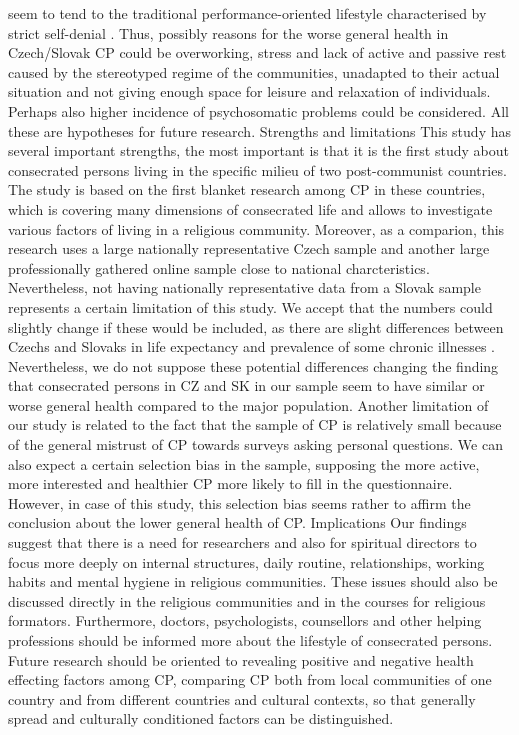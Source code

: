 \documentclass[ijerph,article,accept,moreauthors,pdftex]{mdpi}
\begin{document}
seem to tend to the traditional performance-oriented lifestyle
characterised by strict self-denial \citep{petravcek2013sekularizace}.
Thus, possibly reasons for the worse general health in Czech/Slovak CP
could be overworking, stress and lack of active and passive rest caused
by the stereotyped regime of the communities, unadapted to their actual
situation and not giving enough space for leisure and relaxation of
individuals. Perhaps also higher incidence of psychosomatic problems
could be considered. All these are hypotheses for future research.
Strengths and limitations This study has several important strengths,
the most important is that it is the first study about consecrated
persons living in the specific milieu of two post-communist countries.
The study is based on the first blanket research among CP in these
countries, which is covering many dimensions of consecrated life and
allows to investigate various factors of living in a religious
community. Moreover, as a comparion, this research uses a large
nationally representative Czech sample and another large professionally
gathered online sample close to national charcteristics. Nevertheless,
not having nationally representative data from a Slovak sample
represents a certain limitation of this study. We accept that the
numbers could slightly change if these would be included, as there are
slight differences between Czechs and Slovaks in life expectancy and
prevalence of some chronic illnesses \citep{vagavsova2017disparities}.
Nevertheless, we do not suppose these potential differences changing the
finding that consecrated persons in CZ and SK in our sample seem to have
similar or worse general health compared to the major population.
Another limitation of our study is related to the fact that the sample
of CP is relatively small because of the general mistrust of CP towards
surveys asking personal questions. We can also expect a certain
selection bias in the sample, supposing the more active, more interested
and healthier CP more likely to fill in the questionnaire. However, in
case of this study, this selection bias seems rather to affirm the
conclusion about the lower general health of CP. Implications Our
findings suggest that there is a need for researchers and also for
spiritual directors to focus more deeply on internal structures, daily
routine, relationships, working habits and mental hygiene in religious
communities. These issues should also be discussed directly in the
religious communities and in the courses for religious formators.
Furthermore, doctors, psychologists, counsellors and other helping
professions should be informed more about the lifestyle of consecrated
persons. Future research should be oriented to revealing positive and
negative health effecting factors among CP, comparing CP both from local
communities of one country and from different countries and cultural
contexts, so that generally spread and culturally conditioned factors
can be distinguished.
\end{document}
